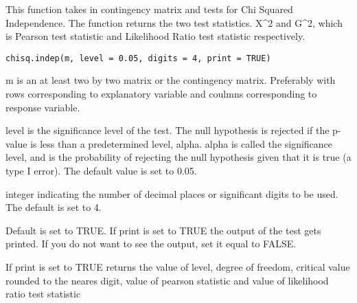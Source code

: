 \documentclass[letterpaper]{book}
\begin{document}
%
\begin{Description}\relax
This function takes in contingency matrix and tests for Chi Squared Independence. The function returns the two test statistics. 
X\textasciicircum{}2 and G\textasciicircum{}2, which is Pearson test statistic and Likelihood Ratio test statistic respectively.    
\end{Description}
%
\begin{Usage}
\begin{verbatim}
chisq.indep(m, level = 0.05, digits = 4, print = TRUE)
\end{verbatim}
\end{Usage}
%
\begin{Arguments}
\begin{ldescription}
\item[\code{m}] 
m is an at least two by two matrix or the contingency matrix. Preferably with rows corresponding to explanatory variable
and coulmns corresponding to response variable.  

\item[\code{level}] 
level is the significance level of the test. 
The null hypothesis is rejected if the p-value is less than a predetermined level, alpha. 
alpha is called the significance level, and is the probability of rejecting the null hypothesis given that it is true (a type I error). 
The default value is set to 0.05. 

\item[\code{digits}] 
integer indicating the number of decimal places or significant digits to be used. The default is set to 4.  

\item[\code{print}] 
Default is set to TRUE. If print is set to TRUE the output of the test gets printed. 
If you do not want to see the output, set it equal to FALSE.

\end{ldescription}
\end{Arguments}
%
\begin{Value}
\begin{ldescription}
\item[\code{}] If print is set to TRUE returns the value of level, degree of freedom, critical value rounded to the neares digit, value of pearson statistic and value of likelihood ratio test statistic
\end{ldescription}




\end{Value}
\end{document}
